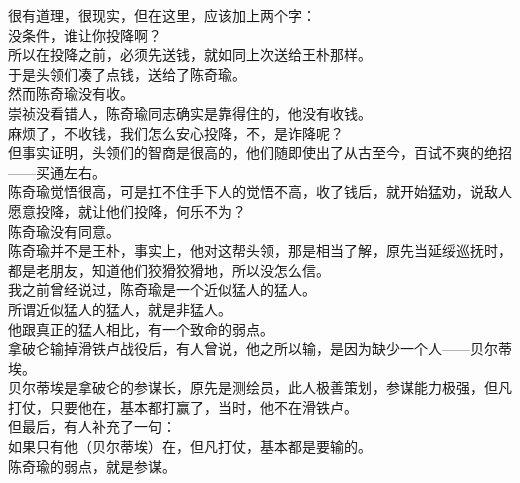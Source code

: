 \begin{multicols}{\theparacolNo}
很有道理，很现实，但在这里，应该加上两个字：\\

没条件，谁让你投降啊？\\

所以在投降之前，必须先送钱，就如同上次送给王朴那样。\\

于是头领们凑了点钱，送给了陈奇瑜。\\

然而陈奇瑜没有收。\\

崇祯没看错人，陈奇瑜同志确实是靠得住的，他没有收钱。\\

麻烦了，不收钱，我们怎么安心投降，不，是诈降呢？\\

但事实证明，头领们的智商是很高的，他们随即使出了从古至今，百试不爽的绝招——买通左右。\\

陈奇瑜觉悟很高，可是扛不住手下人的觉悟不高，收了钱后，就开始猛劝，说敌人愿意投降，就让他们投降，何乐不为？\\

陈奇瑜没有同意。\\

陈奇瑜并不是王朴，事实上，他对这帮头领，那是相当了解，原先当延绥巡抚时，都是老朋友，知道他们狡猾狡猾地，所以没怎么信。\\

我之前曾经说过，陈奇瑜是一个近似猛人的猛人。\\

所谓近似猛人的猛人，就是非猛人。\\

他跟真正的猛人相比，有一个致命的弱点。\\

拿破仑输掉滑铁卢战役后，有人曾说，他之所以输，是因为缺少一个人——贝尔蒂埃。\\

贝尔蒂埃是拿破仑的参谋长，原先是测绘员，此人极善策划，参谋能力极强，但凡打仗，只要他在，基本都打赢了，当时，他不在滑铁卢。\\

但最后，有人补充了一句：\\

如果只有他（贝尔蒂埃）在，但凡打仗，基本都是要输的。\\

陈奇瑜的弱点，就是参谋。\\


\end{multicols}

